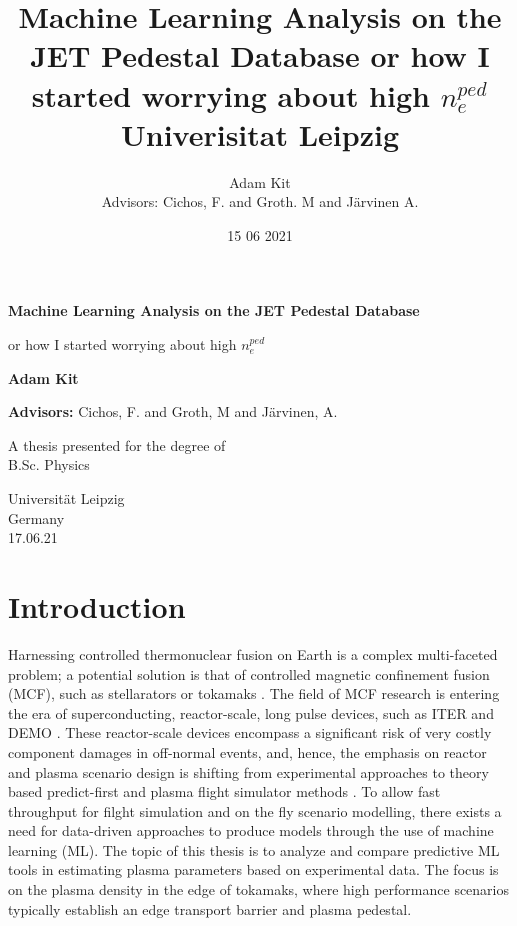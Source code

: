 \documentclass[a4paper, twoside, final, 12pt]{article}
\title{
	{Machine Learning Analysis on the JET Pedestal Database } \vspace{0.5cm}
	{\large or how I started worrying about high $n_e^{ped}$}\\
	{\large Univerisitat Leipzig} \\ 
	}
\author{Adam Kit \\{\small Advisors: Cichos, F. and Groth. M and Järvinen A.}}
\date{15 06 2021}
\begin{document}
\begin{titlepage}
   \begin{center}
       \vspace*{1cm}

       \textbf{Machine Learning Analysis on the JET Pedestal Database }

       \vspace{0.5cm}
        or how I started worrying about high $n_e^{ped}$
            
       \vspace{1.5cm}

       \textbf{Adam Kit}
       
       \vspace{0.5cm}
       \textbf{Advisors:} Cichos, F. and Groth, M and Järvinen, A.

       \vfill
            
       A thesis presented for the degree of\\
       B.Sc. Physics
            
       \vspace{0.8cm}
     
            
       Universität Leipzig\\
       Germany\\
       17.06.21
            
   \end{center}
\end{titlepage}
    \newpage
    \tableofcontents
    \newpage
\section{Introduction}\label{sec:introduction}
Harnessing controlled thermonuclear fusion on Earth is a complex multi-faceted problem; a potential solution is that of controlled magnetic confinement fusion (MCF), such as stellarators or tokamaks \cite{EUROfusionroadmap}. 
The field of MCF research is entering the era of superconducting, reactor-scale, long pulse devices, such as ITER and DEMO \cite{Ikeda_2007, stepladder}.
These reactor-scale devices encompass a significant risk of very costly component damages in off-normal events, and, hence, the emphasis on reactor and plasma scenario design is shifting from experimental approaches to theory based predict-first and plasma flight simulator methods \cite{Meneghini_2017, MOREAU2011535}.
To allow fast throughput for filght simulation and on the fly scenario modelling, there exists a need for data-driven approaches to produce models through the use of machine learning (ML).
The topic of this thesis is to analyze and compare predictive ML tools in estimating plasma parameters based on experimental data. The focus is on the plasma density in the edge of tokamaks, where high performance scenarios typically establish an edge transport barrier and plasma pedestal. 
\end{document}
